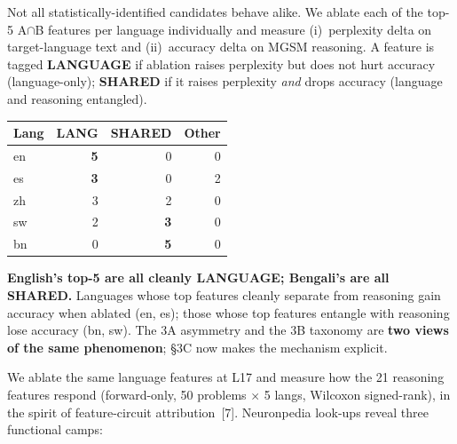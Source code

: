 \documentclass[final]{beamer}
\newlength{\colwidth}
\begin{document}
\begin{frame}[t]
\begin{columns}[t]
\begin{column}{\colwidth}
  \begin{block}{}

    Not all statistically-identified candidates behave alike.
    We ablate each of the top-5 A$\cap$B features per language individually
    and measure (i)~perplexity delta on target-language text and
    (ii)~accuracy delta on MGSM reasoning.
    A feature is tagged \textbf{LANGUAGE} if ablation raises perplexity
    but does not hurt accuracy (language-only);
    \textbf{SHARED} if it raises perplexity \emph{and} drops accuracy
    (language and reasoning entangled).

    \begin{center}
    \renewcommand{\arraystretch}{1.0}
    \small
    \begin{tabular}{l r r r}
    \toprule
    \textbf{Lang} & \textbf{LANG} & \textbf{SHARED} & \textbf{Other} \\
    \midrule
    en & \textbf{5} & 0 & 0 \\
    es & \textbf{3} & 0 & 2 \\
    zh & 3 & 2 & 0 \\
    sw & 2 & \textbf{3} & 0 \\
    bn & 0 & \textbf{5} & 0 \\
    \bottomrule
    \end{tabular}
    \end{center}

    \textbf{English's top-5 are all cleanly LANGUAGE; Bengali's are all
    SHARED.} Languages whose top features cleanly separate from reasoning
    gain accuracy when ablated (en, es); those whose top features entangle
    with reasoning lose accuracy (bn, sw). The 3A asymmetry and the 3B
    taxonomy are \textbf{two views of the same phenomenon}; \S3C now
    makes the mechanism explicit.

    We ablate the same language features at L17 and measure how the 21
    reasoning features respond (forward-only, 50 problems $\times$ 5 langs,
    Wilcoxon signed-rank), in the spirit of feature-circuit attribution~[7].
    Neuronpedia look-ups reveal three functional camps:


\end{block}
\end{column}
\end{columns}
\end{frame}
\end{document}
